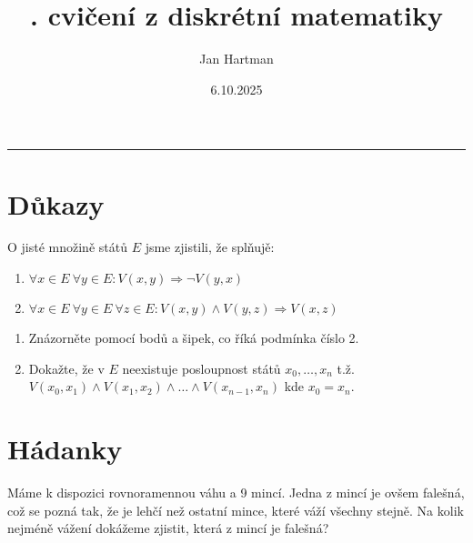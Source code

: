 \documentclass[10pt]{article}
\title{\tutnum. cvičení z diskrétní matematiky}
\author{Jan Hartman}
\date{6.10.2025}
\newcommand{\titlerule}{%
    \noindent %
    \makebox[\textwidth]{\large \thetitle \hfill \thedate}
    \rule{\textwidth}{0.4pt}%
}
\begin{document}
\titlerule

\section{Důkazy}

\begin{problem}
O jisté množině států $E$ jsme zjistili, že splňujě:
\begin{enumerate}
    \item $\forall x \in E \ \forall y \in E: V(x,y) \Rightarrow \neg V(y,x)$
    \item $\forall x \in E \ \forall y \in E \  \forall z \in E : V(x,y) \wedge V(y,z) \Rightarrow V(x,z)$
\end{enumerate} 
\begin{enumerate}[label=(\alph*)]
    \item Znázorněte pomocí bodů a šipek, co říká podmínka číslo 2.
    \item Dokažte, že v $E$ neexistuje posloupnost států $x_0, \ldots , x_n$ t.ž. $V(x_0,x_1) \wedge V(x_1,x_2) \wedge \ldots \wedge  V(x_{n-1},x_n)$ kde $x_0 = x_n$.

\end{enumerate}
\end{problem}

\section{Hádanky}

\begin{problem}
Máme k dispozici rovnoramennou váhu a 9 mincí. Jedna z mincí je ovšem falešná, což se pozná tak, že je lehčí než ostatní mince, které váží všechny stejně. Na kolik nejméně vážení dokážeme zjistit, která z mincí je falešná?
\end{problem}
\end{document}

